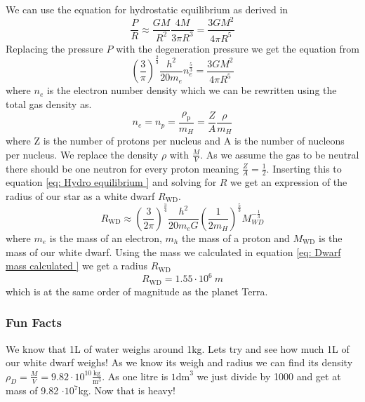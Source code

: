 \documentclass[reprint,english,notitlepage]{revtex4-2}
\begin{document}
We can use the equation for hydrostatic equilibrium as derived in%
\begin{equation}\label{eq: Hydro equilibrium }
  \frac{P}{R} ≈  \frac{GM}{R^{2}} \frac{4M}{3 π R^{3}} = \frac{3GM^{2}}{4 π R^{5}}
\end{equation}
Replacing the pressure $ P $ with the degeneration pressure we get the equation from%
\begin{equation}\label{}
  \left( \frac{3}{π} \right) ^{\frac{2}{3}} \frac{h^{2}}{20m_e} n_{e}^{\frac{5}{3}} = \frac{3GM^{2}}{4 π R^{5}}
\end{equation}
where $ n_e $ is the electron number density which we can be rewritten using the total gas density as. 
\[
n_e = n_p = \frac{ρ_{\text{p}}}{m_{H}} = \frac{Z}{A} \frac{ρ}{m_{H}}
\]
where Z is the number of protons per nucleus and A is the number of nucleons per nucleus. We replace the density $ ρ $ with $ \frac{M}{V} $. As we assume the gas to be neutral there should be one neutron for every proton meaning $ \frac{Z}{A} = \frac{1}{2} $. Inserting this to equation \ref{eq: Hydro equilibrium } and solving for $ R $ we get an expression of the radius of our star as a white dwarf $ R_{\text{WD}} $. 
\begin{equation}\label{eq: Dwarf radius}
  R_{\text{WD}} ≈ \left( \frac{3}{2 π} \right) ^{\frac{3}{4}} \frac{h^{2}}{20 m_e G} \left( \frac{1}{2m_{H}} \right) ^{\frac{5}{3}} M_{WD} ^{-\frac{1}{3}}
\end{equation}
where $ m_e $ is the mass of an electron, $ m_h $ the mass of a proton and $ M_{\text{WD}} $ is the mass of our white dwarf. Using the mass we calculated in equation \ref{eq: Dwarf mass calculated } we get a radius $ R_{\text{WD}} $ 
\begin{equation}\label{eq: Darf radius calculated}
  R_{\text{WD}} = 1.55 ⋅ 10^{6}\ m 
\end{equation}
which is at the same order of magnitude as the planet Terra. 

\subsubsection*{Fun Facts}
We know that 1L of water weighs around 1kg. Lets try and see how much 1L of our white dwarf weighs! As we know its weigh and radius we can find its density $ ρ_{D}  = \frac{M}{V} = 9.82 ⋅ 10^{10} \frac{\text{kg}}{\text{m}^{3}}$. As one litre is $ 1 \text{dm}^{3} $ we just divide by 1000 and get at mass of 9.82 $ ⋅ 10^{7} $kg. Now that is heavy!
\end{document}
